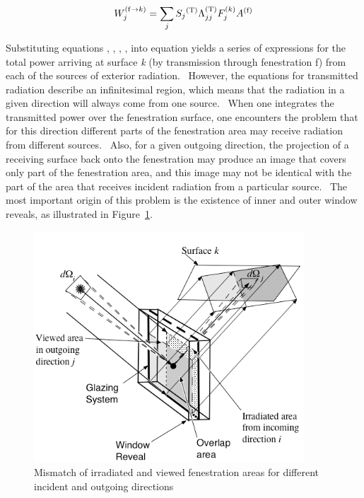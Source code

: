 \begin{equation}
W_j^{{\rm{(f}} \to k{\rm{)}}} = \sum\limits_j {{S_j}^{{\rm{(T)}}}\Lambda_{jj}^{{\rm{(T)}}}F_j^{{\rm{(}}k{\rm{)}}}{A^{{\rm{(f)}}}}}
\end{equation}

Substituting equations , , , , into equation yields a series of expressions for the total power arriving at surface \emph{k} (by transmission through fenestration f) from each of the sources of exterior radiation.~ However, the equations for transmitted radiation describe an infinitesimal region, which means that the radiation in a given direction will always come from one source.~ When one integrates the transmitted power over the fenestration surface, one encounters the problem that for this direction different parts of the fenestration area may receive radiation from different sources.~ Also, for a given outgoing direction, the projection of a receiving surface back onto the fenestration may produce an image that covers only part of the fenestration area, and this image may not be identical with the part of the area that receives incident radiation from a particular source.~ The most important origin of this problem is the existence of inner and outer window reveals, as illustrated in Figure~\ref{fig:mismatch-of-irradiated-and-viewed}.

\begin{figure}[hbtp] %
\centering
\includegraphics[width=0.9\textwidth, height=0.9\textheight, keepaspectratio=true]{media/image1392.png}
\caption{Mismatch of irradiated and viewed fenestration areas for different incident and outgoing directions \protect \label{fig:mismatch-of-irradiated-and-viewed}}
\end{figure}

